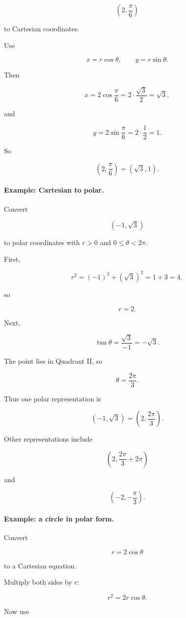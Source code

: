 \[
\left(2,\frac{\pi}{6}\right)
\]

to Cartesian coordinates.

Use

\[
x=r\cos\theta,
\qquad
y=r\sin\theta.
\]

Then

\[
x=2\cos\frac{\pi}{6}=2\cdot\frac{\sqrt3}{2}=\sqrt3,
\]

and

\[
y=2\sin\frac{\pi}{6}=2\cdot\frac12=1.
\]

So

\[
\boxed{
\left(2,\frac{\pi}{6}\right)=(\sqrt3,1).
}
\]

\paragraph{Example: Cartesian to polar.}
Convert

\[
(-1,\sqrt3)
\]

to polar coordinates with \(r>0\) and \(0\le\theta<2\pi\).

First,

\[
r^2=(-1)^2+(\sqrt3)^2=1+3=4,
\]

so

\[
r=2.
\]

Next,

\[
\tan\theta=\frac{\sqrt3}{-1}=-\sqrt3.
\]

The point lies in Quadrant II, so

\[
\theta=\frac{2\pi}{3}.
\]

Thus one polar representation is

\[
\boxed{
(-1,\sqrt3)=\left(2,\frac{2\pi}{3}\right).
}
\]

Other representations include

\[
\left(2,\frac{2\pi}{3}+2\pi\right)
\]

and

\[
\left(-2,-\frac{\pi}{3}\right).
\]

\paragraph{Example: a circle in polar form.}
Convert

\[
r=2\cos\theta
\]

to a Cartesian equation.

Multiply both sides by \(r\):

\[
r^2=2r\cos\theta.
\]

Now use

